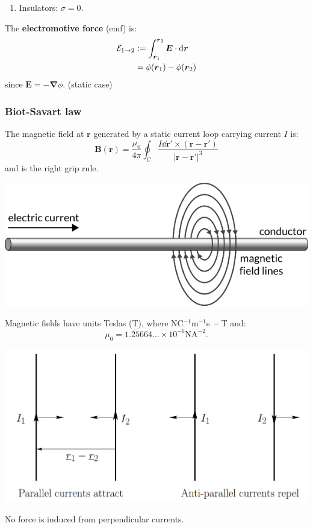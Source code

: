 \documentclass{article}
\newcommand{\deq}{\vcentcolon=}
\newcommand{\vc}[1]{\boldsymbol{#1}}
\begin{document}
\begin{multicols*}{3}
\begin{enumerate}
    \item Insulators: $\sigma=0$.
\end{enumerate}
The \textbf{electromotive force} (emf) is:
\begin{align*}
    \mathcal{E}_{1\rightarrow2}
    &\deq\int_{\vc{r}_1}^{\vc{r}_2}\vc{E}\cdot\dd\vc{r} \\
    &=\phi(\vc{r}_1)-\phi(\vc{r}_2)
\end{align*}
since $\vc{E}=-\vc{\nabla}\phi$. (static case)

\subsubsection*{Biot-Savart law}
The magnetic field at $\vc{r}$ generated by a static
current loop carrying current $I$ is:
$$\vc{B}(\vc{r})=\frac{\mu_0}{4\pi}\oint_C
\frac{I\dd\vc{r}'\times(\vc{r}-\vc{r}')}{|\vc{r}-\vc{r}'|^3}$$
and is the right grip rule.
\begin{center}
    \includegraphics[scale=0.2]{f5.png}
\end{center}
Magnetic fields have units Teslas (T),
where NC$^{-1}$m$^{-1}$s
$\hspace{0.00000001in}=\hspace{0.02in}$T and:
$$\mu_0=1.25664\dots\times10^{-6}\text{N}\text{A}^{-2}.$$
\begin{center}
    \includegraphics[scale=0.2]{f6.png}
\end{center}
No force is induced from perpendicular currents.


\end{multicols*}
\end{document}
